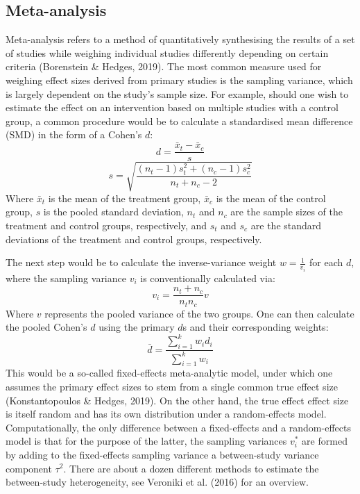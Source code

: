 \documentclass[
  man,floatsintext]{apa6}
\begin{document}
\hypertarget{meta-analysis}{%
\subsection{Meta-analysis}\label{meta-analysis}}

Meta-analysis refers to a method of quantitatively synthesising the results of a set of studies while weighing individual studies differently depending on certain criteria (Borenstein \& Hedges, 2019). The most common measure used for weighing effect sizes derived from primary studies is the sampling variance, which is largely dependent on the study's sample size. For example, should one wish to estimate the effect on an intervention based on multiple studies with a control group, a common procedure would be to calculate a standardised mean difference (SMD) in the form of a Cohen's \(d\):
\[
d={\frac {{\bar{x}}_{t}-{\bar{x}}_{c}}{s}} 
\tag{2}
\]
\[
s={\sqrt {\frac {(n_{t}-1)s_{t}^{2}+(n_{c}-1)s_{c}^{2}}{n_{t}+n_{c}-2}}}
\tag{3}
\]
Where \({\bar{x}}_{t}\) is the mean of the treatment group, \({\bar{x}}_{c}\) is the mean of the control group, \(s\) is the pooled standard deviation, \(n_{t}\) and \(n_{c}\) are the sample sizes of the treatment and control groups, respectively, and \(s_{t}\) and \(s_{c}\) are the standard deviations of the treatment and control groups, respectively.

The next step would be to calculate the inverse-variance weight \(w=\frac{1}{v_i}\) for each \(d\), where the sampling variance \(v_i\) is conventionally calculated via:
\[
v_i={\frac{n_{t}+n_{c}}{n_{t}n_{c}}}v
\tag{4}
\]
Where \(v\) represents the pooled variance of the two groups. One can then calculate the pooled Cohen's \(d\) using the primary \(d\)s and their corresponding weights:
\[
\bar{d}={\frac{\sum_{i=1}^{k}w_id_i}{\sum_{i=1}^{k}w_i}}
\tag{5}
\]
This would be a so-called fixed-effects meta-analytic model, under which one assumes the primary effect sizes to stem from a single common true effect size (Konstantopoulos \& Hedges, 2019). On the other hand, the true effect effect size is itself random and has its own distribution under a random-effects model. Computationally, the only difference between a fixed-effects and a random-effects model is that for the purpose of the latter, the sampling variances \(v^*_i\) are formed by adding to the fixed-effects sampling variance a between-study variance component \(\tau^2\). There are about a dozen different methods to estimate the between-study heterogeneity, see Veroniki et al. (2016) for an overview.
\end{document}
